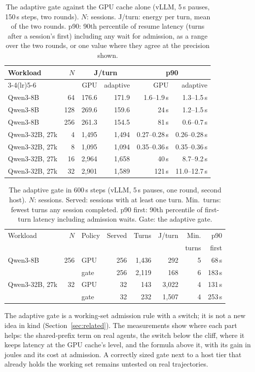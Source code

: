 \begin{table}[t]
\centering\small
\caption{The adaptive gate against the GPU cache alone (vLLM, 5\,s pauses, 150\,s steps, two rounds). $N$: sessions. J/turn: energy per turn, mean of the two rounds. p90: 90th
percentile of resume latency (turns after a session's first) including any wait for admission, as a range over the two rounds, or one value where they agree at the precision shown.}
\label{tab:adaptive}
\setlength{\tabcolsep}{3pt}
\begin{tabular}{lrrrrr}
\toprule
Workload & $N$ & \multicolumn{2}{c}{J/turn} & \multicolumn{2}{c}{p90} \\
\cmidrule(lr){3-4}\cmidrule(lr){5-6}
 & & GPU & adaptive & GPU & adaptive \\
\midrule
Qwen3-8B & 64 & 176.6 & 171.9 & 1.6--1.9\,s & 1.3--1.5\,s \\
Qwen3-8B & 128 & 269.6 & 159.6 & 24\,s & 1.2--1.5\,s \\
Qwen3-8B & 256 & 261.3 & 154.5 & 81\,s & 0.6--0.7\,s \\
Qwen3-32B, 27k & 4 & 1,495 & 1,494 & 0.27--0.28\,s & 0.26--0.28\,s \\
Qwen3-32B, 27k & 8 & 1,095 & 1,094 & 0.35--0.36\,s & 0.35--0.36\,s \\
Qwen3-32B, 27k & 16 & 2,964 & 1,658 & 40\,s & 8.7--9.2\,s \\
Qwen3-32B, 27k & 32 & 2,901 & 1,589 & 121\,s & 11.0--12.7\,s \\
\bottomrule
\end{tabular}
\end{table}

\begin{table}[t]
\centering\small
\caption{The adaptive gate in 600\,s steps (vLLM, 5\,s pauses, one round, second host). $N$: sessions. Served: sessions with at
least one turn. Min.\ turns: fewest turns any session completed. p90 first: 90th percentile of first-turn latency including
admission waits. Gate: the adaptive gate.}
\label{tab:tenmin}
\setlength{\tabcolsep}{2.4pt}
\begin{tabular}{lrlrrrrr}
\toprule
Workload & $N$ & Policy & Served & Turns & J/turn & Min. & p90 \\
 & & & & & & turns & first \\
\midrule
Qwen3-8B & 256 & GPU & 256 & 1,436 & 292 & 5 & 68\,s \\
 & & gate & 256 & 2,119 & 168 & 6 & 183\,s \\
Qwen3-32B, 27k & 32 & GPU & 32 & 143 & 3,022 & 4 & 131\,s \\
 & & gate & 32 & 232 & 1,507 & 4 & 253\,s \\
\bottomrule
\end{tabular}
\end{table}

The adaptive gate is a working-set admission rule with a switch; it is not a new idea in kind (Section~\ref{sec:related}).
The measurements show where each part helps: the shared-prefix term on real agents, the switch below the cliff, where it keeps latency at the GPU cache's level, and
the formula above it, with its gain in joules and its cost at admission. A correctly sized gate next to a host tier
that already holds the working set remains untested on real trajectories.
